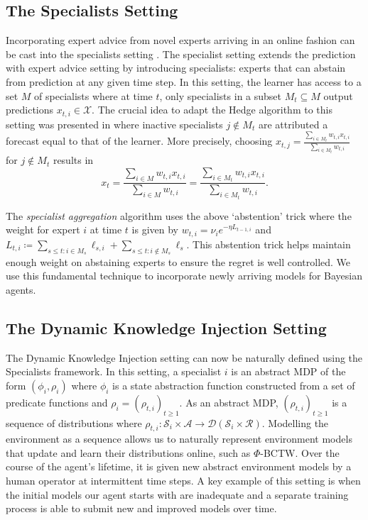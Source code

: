 \documentclass[letterpaper]{article} %
\newcommand {\St}{\mathcal{S}}
\newcommand {\A}{\mathcal{A}}
\newcommand {\Dist}{\mathcal{D}}
\newcommand {\Reward}{\mathcal{R}}
\theoremstyle{definition}
\begin{document}
\subsection{The Specialists Setting}
Incorporating expert advice from novel experts arriving in an online fashion can be cast into the specialists setting \cite{FSSW97}. The specialist setting extends the prediction with expert advice setting by introducing specialists: experts that can abstain from prediction at any given time step. In this setting, the learner has access to a set $M$ of specialists where at time $t$, only specialists in a subset $M_t \subseteq M$ output predictions $x_{t, i} \in \mathcal{X}$. 
The crucial idea to adapt the Hedge algorithm to this setting was presented in \cite{CV09} where inactive specialists $j \notin M_t$ are attributed a forecast equal to that of the learner.
More precisely, choosing 
$x_{t, j} = \frac{ \sum_{i \in M_t} w_{t, i} x_{t, i} }{ \sum_{i \in M_t} w_{t, i} }$
for  $j \notin M_t$ results in $$x_t = \frac{\sum_{i \in M} w_{t, i} x_{t, i}}{\sum_{i \in M} w_{t,i}} = \frac{ \sum_{i \in M_t} w_{t, i} x_{t, i} }{ \sum_{i \in M_t} w_{t, i} }.$$

The \textit{specialist aggregation} algorithm uses the above `abstention' trick where the weight for expert $i$ at time $t$ is given by $w_{t, i} = \nu_i e^{-\eta L_{t-1, i}}$ and $L_{t, i} \coloneqq \sum_{s \leq t: i \in M_s} \ell_{s, i} + \sum_{s \leq t: i \notin M_s} \ell_s$. 
This abstention trick helps maintain enough weight on abstaining experts to ensure the regret is well controlled. We use this fundamental technique to incorporate newly arriving models for Bayesian agents.


\subsection{The Dynamic Knowledge Injection Setting}
The Dynamic Knowledge Injection setting can now be naturally defined using the Specialists framework.
In this setting, a specialist $i$ is an abstract MDP of the form $(\phi_i, \rho_i)$ where $\phi_i$ is a state abstraction function constructed from a set of predicate functions and $\rho_i = (\rho_{t, i})_{t \geq 1}$.
As an abstract MDP, $(\rho_{t, i})_{t \geq 1}$ is a sequence of distributions where $\rho_{t, i}: \St_{i} \times \A \to \Dist(\St_{i} \times \Reward)$.
Modelling the environment as a sequence allows us to naturally represent environment models that update and learn their distributions online, such as $\Phi$-BCTW. 
Over the course of the agent's lifetime, it is given new abstract environment models by a human operator at intermittent time steps.
A key example of this setting is when the initial models our agent starts with are inadequate and a separate training process is able to submit new and improved models over time. 
\end{document}
